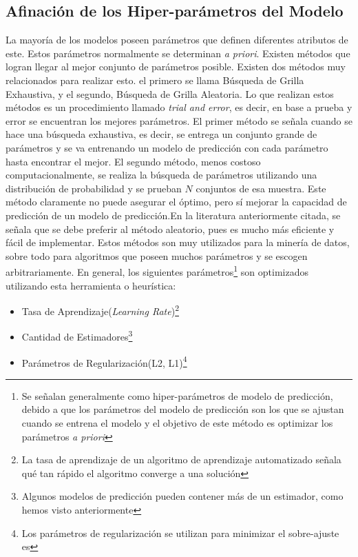 
\subsection{Afinación de los Hiper-parámetros del Modelo}
La mayoría de los modelos poseen parámetros que definen diferentes atributos de este. Estos parámetros normalmente se determinan \textit{a priori}. Existen métodos que logran llegar al mejor conjunto de parámetros posible. Existen dos métodos muy relacionados para realizar esto. el primero se llama Búsqueda de Grilla Exhaustiva, y el segundo, Búsqueda de Grilla Aleatoria\citep{Bergstra}. Lo que realizan estos métodos es un procedimiento llamado \textit{trial and error}, es decir, en base a prueba y error se encuentran los mejores parámetros. El primer método se señala cuando se hace una búsqueda exhaustiva, es decir, se entrega un conjunto grande de parámetros y se va entrenando un modelo de predicción con cada parámetro hasta encontrar el mejor. El segundo método, menos costoso computacionalmente, se realiza la búsqueda de parámetros utilizando una distribución de probabilidad y se prueban $N$ conjuntos de esa muestra. Este método claramente no puede asegurar el óptimo, pero sí mejorar la capacidad de predicción de un modelo de predicción.En la literatura anteriormente citada, se señala que se debe preferir al método aleatorio, pues es mucho más eficiente y fácil de implementar.
Estos métodos son muy utilizados para la minería de datos, sobre todo para algoritmos que poseen muchos parámetros y se escogen arbitrariamente.
En general, los siguientes parámetros\footnote{Se señalan generalmente como hiper-parámetros de modelo de predicción, debido a que los parámetros del modelo de predicción son los que se ajustan cuando se entrena el modelo y el objetivo de este método es optimizar los parámetros \textit{a priori}} son optimizados utilizando esta herramienta o heurística:
\begin{itemize}
\item Tasa de Aprendizaje(\textit{Learning Rate})\footnote{La tasa de aprendizaje de un algoritmo de aprendizaje automatizado señala qué tan rápido el algoritmo converge a una solución}
\item Cantidad de Estimadores\footnote{Algunos modelos de predicción pueden contener más de un estimador, como hemos visto anteriormente}
\item Parámetros de Regularización(L2, L1)\footnote{Los parámetros de regularización se utilizan para minimizar el sobre-ajuste es}
\end{itemize}
